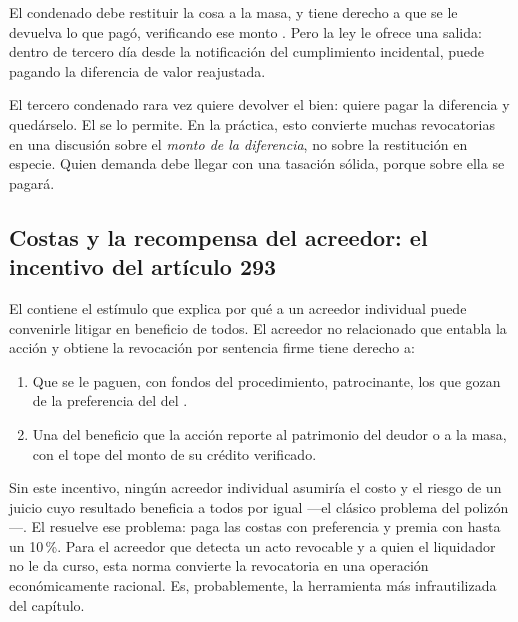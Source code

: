 El condenado debe restituir la cosa a la masa, y tiene derecho a que se le devuelva lo que
pagó, verificando ese monto . Pero la ley le ofrece una salida: dentro de tercero día desde la
notificación del cumplimiento incidental, puede  pagando la diferencia de valor reajustada.

\begin{practica}
El tercero condenado rara vez quiere devolver el bien: quiere pagar la diferencia y quedárselo.
El  se lo permite. En la práctica, esto convierte muchas revocatorias en una
discusión sobre el \emph{monto de la diferencia}, no sobre la restitución en especie. Quien
demanda debe llegar con una tasación sólida, porque sobre ella se pagará.
\end{practica}

\subsection{Costas y la recompensa del acreedor: el incentivo del artículo 293}

El  contiene el estímulo que explica por qué a un acreedor individual puede convenirle
litigar en beneficio de todos. El acreedor no relacionado que 
entabla la acción y obtiene la revocación por sentencia firme tiene derecho a:

\begin{enumerate}
  \item Que se le paguen, con fondos del procedimiento,  patrocinante, los que gozan de la preferencia del
   del .
  \item Una  del beneficio que la acción reporte al
  patrimonio del deudor o a la masa, con el tope del monto de su crédito verificado.
\end{enumerate}

\begin{foco}
Sin este incentivo, ningún acreedor individual asumiría el costo y el riesgo de un juicio cuyo
resultado beneficia a todos por igual ---el clásico problema del polizón---. El 
resuelve ese problema: paga las costas con preferencia y premia con hasta un 10\,\%. Para el
acreedor que detecta un acto revocable y a quien el liquidador no le da curso, esta norma
convierte la revocatoria en una operación económicamente racional. Es, probablemente, la
herramienta más infrautilizada del capítulo.
\end{foco}

